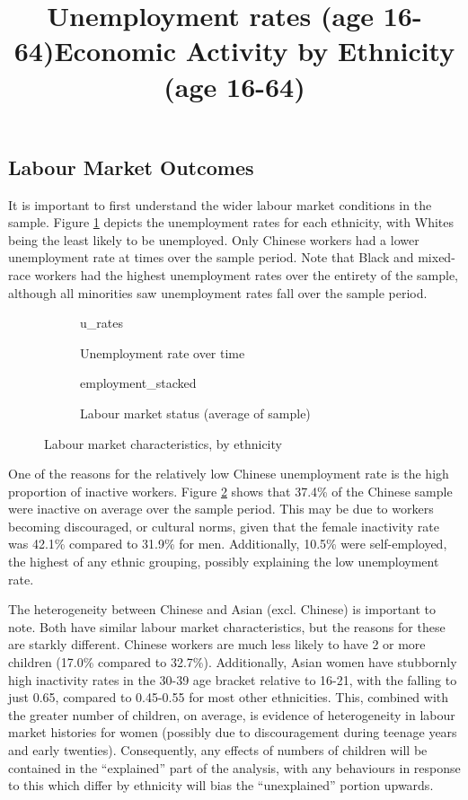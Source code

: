\documentclass[class=article, crop=false]{standalone}
\begin{document}
\subsection{Labour Market Outcomes}
\label{sec:Labour Market Outcomes}
It is important to first understand the wider labour market conditions in the sample. Figure \ref{fig:u_rates} depicts the unemployment rates for each ethnicity, with Whites being the least likely to be unemployed. Only Chinese workers had a lower unemployment rate at times over the sample period. Note that Black and mixed-race workers had the highest unemployment rates over the entirety of the sample, although all minorities saw unemployment rates fall over the sample period.
\begin{figure}[h]
\begin{subfigure}{0.5\textwidth}
\centering
    \title{Unemployment rates (age 16-64)}
    {u_rates}
    \caption{Unemployment rate over time}
    \label{fig:u_rates}
\end{subfigure}
\begin{subfigure}{0.5\textwidth}
\centering
    \title{Economic Activity by Ethnicity (age 16-64)}
    {employment_stacked}
    \caption{Labour market status (average of sample)}
    \label{fig:employment_stacked}
\end{subfigure}
\caption{Labour market characteristics, by ethnicity}
\label{fig:labour_market}
\end{figure}

One of the reasons for the relatively low Chinese unemployment rate is the high proportion of inactive workers. Figure \ref{fig:employment_stacked} shows that 37.4\% of the Chinese sample were inactive on average over the sample period. This may be due to workers becoming discouraged, or cultural norms, given that the female inactivity rate was 42.1\% compared to 31.9\% for men. Additionally, 10.5\% were self-employed, the highest of any ethnic grouping, possibly explaining the low unemployment rate.

The heterogeneity between Chinese and Asian (excl. Chinese) is important to note. Both have similar labour market characteristics, but the reasons for these are starkly different. Chinese workers are much less likely to have 2 or more children (17.0\% compared to 32.7\%). Additionally, Asian women have stubbornly high inactivity rates in the 30-39 age bracket relative to 16-21, with the falling to just 0.65, compared to 0.45-0.55 for most other ethnicities. This, combined with the greater number of children, on average, is evidence of heterogeneity in labour market histories for women (possibly due to discouragement during teenage years and early twenties). Consequently, any effects of numbers of children will be contained in the \enquote{explained} part of the analysis, with any behaviours in response to this which differ by ethnicity will bias the \enquote{unexplained} portion upwards.
\end{document}
